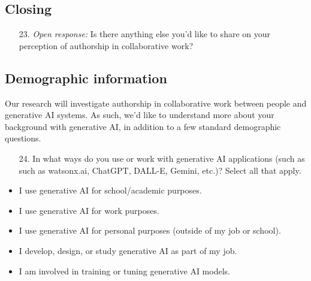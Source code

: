 
\subsection{Closing}

\begin{itemize}[leftmargin=0pt, itemindent=2em]
    \item[23.] \textit{Open response:} Is there anything else you’d like to share on your perception of authorship in collaborative work?
\end{itemize}

\subsection{Demographic information}

Our research will investigate authorship in collaborative work between people and generative AI systems. As such, we’d like to understand more about your background with generative AI, in addition to a few standard demographic questions.

\begin{itemize}[leftmargin=0pt, itemindent=2em]
    \item[24.] In what ways do you use or work with generative AI applications (such as such as watsonx.ai, ChatGPT, DALL-E, Gemini, etc.)? Select all that apply.
    \item I use generative AI for school/academic purposes.
    \item I use generative AI for work purposes.
    \item I use generative AI for personal purposes (outside of my job or school).
    \item I develop, design, or study generative AI as part of my job.
    \item I am involved in training or tuning generative AI models.
\end{itemize}

